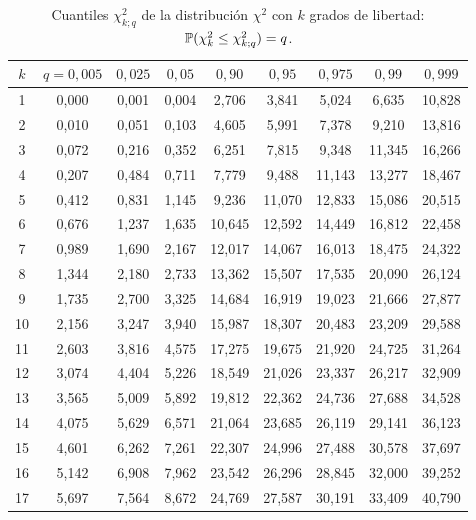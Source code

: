 \begin{table}[ht]
\centering\small
\caption{Cuantiles $\chi^{2}_{k;q}$ de la distribución $\chi^{2}$ con $k$ grados de libertad: $\mathbb{P}(\chi^{2}_k\le\chi^{2}_{k;q})=q$.}\label{tab:chi2}
\begin{tabular}{@{}c|cccccccc@{}}
\toprule
$k$ & $q=0{,}005$ & $0{,}025$ & $0{,}05$ & $0{,}90$ & $0{,}95$ & $0{,}975$ & $0{,}99$ & $0{,}999$ \\
\midrule
1 & 0{,}000 & 0{,}001 & 0{,}004 & 2{,}706 & 3{,}841 & 5{,}024 & 6{,}635 & 10{,}828 \\
2 & 0{,}010 & 0{,}051 & 0{,}103 & 4{,}605 & 5{,}991 & 7{,}378 & 9{,}210 & 13{,}816 \\
3 & 0{,}072 & 0{,}216 & 0{,}352 & 6{,}251 & 7{,}815 & 9{,}348 & 11{,}345 & 16{,}266 \\
4 & 0{,}207 & 0{,}484 & 0{,}711 & 7{,}779 & 9{,}488 & 11{,}143 & 13{,}277 & 18{,}467 \\
5 & 0{,}412 & 0{,}831 & 1{,}145 & 9{,}236 & 11{,}070 & 12{,}833 & 15{,}086 & 20{,}515 \\
6 & 0{,}676 & 1{,}237 & 1{,}635 & 10{,}645 & 12{,}592 & 14{,}449 & 16{,}812 & 22{,}458 \\
7 & 0{,}989 & 1{,}690 & 2{,}167 & 12{,}017 & 14{,}067 & 16{,}013 & 18{,}475 & 24{,}322 \\
8 & 1{,}344 & 2{,}180 & 2{,}733 & 13{,}362 & 15{,}507 & 17{,}535 & 20{,}090 & 26{,}124 \\
9 & 1{,}735 & 2{,}700 & 3{,}325 & 14{,}684 & 16{,}919 & 19{,}023 & 21{,}666 & 27{,}877 \\
10 & 2{,}156 & 3{,}247 & 3{,}940 & 15{,}987 & 18{,}307 & 20{,}483 & 23{,}209 & 29{,}588 \\
11 & 2{,}603 & 3{,}816 & 4{,}575 & 17{,}275 & 19{,}675 & 21{,}920 & 24{,}725 & 31{,}264 \\
12 & 3{,}074 & 4{,}404 & 5{,}226 & 18{,}549 & 21{,}026 & 23{,}337 & 26{,}217 & 32{,}909 \\
13 & 3{,}565 & 5{,}009 & 5{,}892 & 19{,}812 & 22{,}362 & 24{,}736 & 27{,}688 & 34{,}528 \\
14 & 4{,}075 & 5{,}629 & 6{,}571 & 21{,}064 & 23{,}685 & 26{,}119 & 29{,}141 & 36{,}123 \\
15 & 4{,}601 & 6{,}262 & 7{,}261 & 22{,}307 & 24{,}996 & 27{,}488 & 30{,}578 & 37{,}697 \\
16 & 5{,}142 & 6{,}908 & 7{,}962 & 23{,}542 & 26{,}296 & 28{,}845 & 32{,}000 & 39{,}252 \\
17 & 5{,}697 & 7{,}564 & 8{,}672 & 24{,}769 & 27{,}587 & 30{,}191 & 33{,}409 & 40{,}790 \\

\end{tabular}
\end{table}
